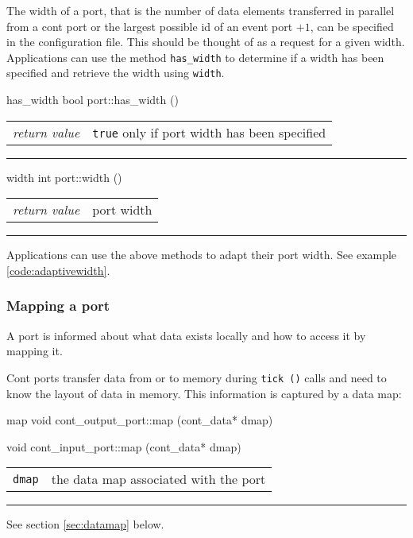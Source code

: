 \documentclass[a4paper]{report}
\makeatletter
\newenvironment{parameters}%
{\begin{tabular}{@{\hspace{2em}}lp{0.6\textwidth}}}%
{\end{tabular}\par\vspace{1mm}\par\hrule\par\vspace{5mm}}
\makeatother
\begin{document}
The width of a port, that is the number of data
elements transferred in parallel from a cont port or the largest
possible id of an event port $+ 1$, can be specified in the
configuration file. This should be thought of as a request for a given
width.  Applications can use the method \lstinline|has_width| to
determine if a width has been specified and retrieve the width using
\lstinline|width|.

\begin{head}{has_width}
  bool port::has_width ()
\end{head}
\begin{parameters}
  \emph{return value} & \lstinline|true| only if port width has been
                         specified \\
\end{parameters}

\begin{head}{width}
  int port::width ()
\end{head}
\begin{parameters}
  \emph{return value} & port width \\
\end{parameters}

Applications can use the above methods to adapt their port width.  See
example \ref{code:adaptivewidth}.

\subsubsection{Mapping a port}

A port is informed about what data exists locally and how to access it
by mapping it.

Cont ports transfer data from or to memory during \lstinline|tick ()|
calls and need to know the layout of data in memory.  This information
is captured by a data map:

\begin{head}{map}
  void cont_output_port::map (cont_data* dmap)

  void cont_input_port::map (cont_data* dmap)
\end{head}
\begin{parameters}
  \lstinline|dmap| & the data map associated with the port \\
\end{parameters}

See section \ref{sec:datamap} below.
\end{document}
